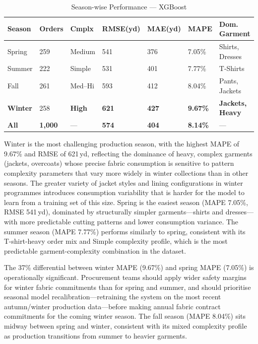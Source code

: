 \begin{table}[htbp]
\centering\footnotesize\tabcolsep=4pt\caption{Season-wise Performance --- XGBoost}\label{tab:seasonal}
\begin{tabularx}{\textwidth}{@{}Z Y Y Y Y Y Z@{}}
  \toprule
  \textbf{Season}&\textbf{Orders}&\textbf{Cmplx}&\textbf{RMSE(yd)}&\textbf{MAE(yd)}&\textbf{MAPE}&\textbf{Dom. Garment}\\
  \midrule
  Spring&259&Medium&541&376&7.05\%&Shirts, Dresses\\
  Summer&222&Simple&531&401&7.77\%&T-Shirts\\
  Fall&261&Med--Hi&593&412&8.04\%&Pants, Jackets\\
  \textbf{Winter}&258&\textbf{High}&\textbf{621}&\textbf{427}&\textbf{9.67\%}&\textbf{Jackets, Heavy}\\
  \midrule\textbf{All}&\textbf{1{,}000}&---&\textbf{574}&\textbf{404}&\textbf{8.14\%}&---\\
  \bottomrule
\end{tabularx}
\end{table}

Winter is the most challenging production season, with the highest MAPE of 9.67\% and RMSE of 621\,yd, reflecting the dominance of heavy, complex garments (jackets, overcoats) whose precise fabric consumption is sensitive to pattern complexity parameters that vary more widely in winter collections than in other seasons. The greater variety of jacket styles and lining configurations in winter programmes introduces consumption variability that is harder for the model to learn from a training set of this size. Spring is the easiest season (MAPE 7.05\%, RMSE 541\,yd), dominated by structurally simpler garments---shirts and dresses---with more predictable cutting patterns and lower consumption variance. The summer season (MAPE 7.77\%) performs similarly to spring, consistent with its T-shirt-heavy order mix and Simple complexity profile, which is the most predictable garment-complexity combination in the dataset.

The 37\% differential between winter MAPE (9.67\%) and spring MAPE (7.05\%) is operationally significant. Procurement teams should apply wider safety margins for winter fabric commitments than for spring and summer, and should prioritise seasonal model recalibration---retraining the system on the most recent autumn/winter production data---before making annual fabric contract commitments for the coming winter season. The fall season (MAPE 8.04\%) sits midway between spring and winter, consistent with its mixed complexity profile as production transitions from summer to heavier garments.

